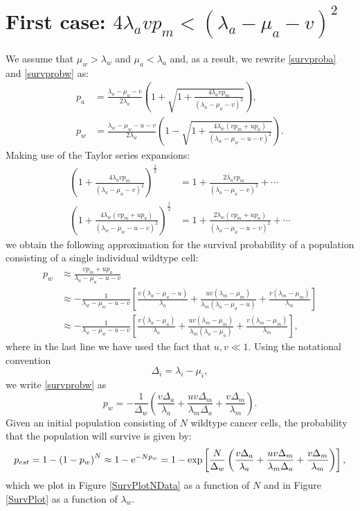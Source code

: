 \documentclass[11pt,a4paper]{article}
\newcommand{\e}{{\rm e}}
\begin{document}
\section{First case: $4\lambda_avp_m<\left(\lambda_a-\mu_a-v\right)^2$}
We assume that $\mu_w>\lambda_w$ and $\mu_a<\lambda_a$ and, as a result, we rewrite \eqref{survproba} and \eqref{survprobw} as:
\begin{align*}
p_a&=\frac{\lambda_a-\mu_a-v}{2\lambda_a}\left(1+\sqrt{1+\frac{4\lambda_avp_m}{\left(\lambda_a-\mu_a-v\right)^2}}\right),\\
p_w&=\frac{\lambda_w-\mu_w-u-v}{2\lambda_w}\left(1-\sqrt{1+\frac{4\lambda_w\left(vp_m+up_a\right)}{\left(\lambda_w-\mu_w-u-v\right)^2}}\right).
\end{align*}
Making use of the Taylor series expansions:
\begin{align*}
\left(1+\frac{4\lambda_avp_m}{\left(\lambda_a-\mu_a-v\right)^2}\right)^{\frac{1}{2}}&=1+\frac{2\lambda_avp_m}{\left(\lambda_a-\mu_a-v\right)^2}+\cdots\\
\left(1+\frac{4\lambda_w\left(vp_m+up_a\right)}{\left(\lambda_w-\mu_w-u-v\right)^2}\right)^{\frac{1}{2}}&=1+\frac{2\lambda_w\left(vp_m+up_a\right)}{\left(\lambda_a-\mu_a-u-v\right)^2}+\cdots
\end{align*}
we obtain the following approximation for the survival probability of a population consisting of a single individual wildtype cell:
\begin{align}\label{survprobwinitial}
p_w&\approx\frac{vp_m+up_a}{\lambda_a-\mu_a-u-v}\\
\nonumber
&\approx-\frac{1}{\lambda_w-\mu_w-u-v}\left[\frac{v\left(\lambda_a-\mu_a-u\right)}{\lambda_a}+\frac{uv\left(\lambda_m-\mu_m\right)}{\lambda_m\left(\lambda_a-\mu_a-u\right)}+\frac{v\left(\lambda_m-\mu_m\right)}{\lambda_m}\right]\\ \label{survprobw}
&\approx-\frac{1}{\lambda_w-\mu_w-u-v}\left[\frac{v\left(\lambda_a-\mu_a\right)}{\lambda_a}+\frac{uv\left(\lambda_m-\mu_m\right)}{\lambda_m\left(\lambda_a-\mu_a\right)}+\frac{v\left(\lambda_m-\mu_m\right)}{\lambda_m}\right],
\end{align}
where in the last line we have used the fact that $u,v\ll1$. Using the notational convention
\begin{equation}\label{notationalconv}
\Delta_i=\lambda_i-\mu_i,
\end{equation}
we write \eqref{survprobw} as
\begin{equation}\label{survprobwapprox}
p_w=-\frac{1}{\Delta_w}\left(\frac{v\Delta_a}{\lambda_a}+\frac{uv\Delta_m}{\lambda_m\Delta_a}+\frac{v\Delta_m}{\lambda_m}\right).
\end{equation}
Given an initial population consisting of $N$ wildtype cancer cells, the probability that the population will survive is given by: 
\begin{align}
p_{est}=1-\left(1-p_w\right)^N\approx 1-\e^{-Np_w}=1-\exp\left[\frac{N}{\Delta_w}\left(\frac{v\Delta_a}{\lambda_a}+\frac{uv\Delta_m}{\lambda_m\Delta_a}+\frac{v\Delta_m}{\lambda_m}\right)\right],
\end{align}
which we plot in Figure \ref{SurvPlotNData} as a function of $N$ and in Figure \ref{SurvPlot} as a function of $\lambda_w$. 
\end{document}
